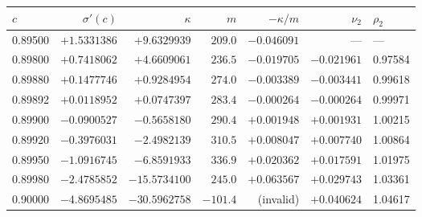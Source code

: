 \begin{tabular}{@{}lrrrrrl@{}}
\toprule
$c$ & $\sigma'(c)$ & $\kappa$ & $m$ & $-\kappa/m$ & $\nu_2$ & $\rho_2$\\
\midrule
0.89500 & $+1.5331386$ & $+9.6329939$ & $209.0$ & $-0.046091$ & --- & ---\\
0.89800 & $+0.7418062$ & $+4.6609061$ & $236.5$ & $-0.019705$ & $-0.021961$ & 0.97584\\
0.89880 & $+0.1477746$ & $+0.9284954$ & $274.0$ & $-0.003389$ & $-0.003441$ & 0.99618\\
0.89892 & $+0.0118952$ & $+0.0747397$ & $283.4$ & $-0.000264$ & $-0.000264$ & 0.99971\\
0.89900 & $-0.0900527$ & $-0.5658180$ & $290.4$ & $+0.001948$ & $+0.001931$ & 1.00215\\
0.89920 & $-0.3976031$ & $-2.4982139$ & $310.5$ & $+0.008047$ & $+0.007740$ & 1.00864\\
0.89950 & $-1.0916745$ & $-6.8591933$ & $336.9$ & $+0.020362$ & $+0.017591$ & 1.01975\\
0.89980 & $-2.4785852$ & $-15.5734100$ & $245.0$ & $+0.063567$ & $+0.029743$ & 1.03361\\
0.90000 & $-4.8695485$ & $-30.5962758$ & $-101.4$ & (invalid) & $+0.040624$ & 1.04617\\
\bottomrule
\end{tabular}
